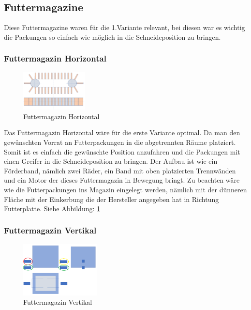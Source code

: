 \subsection{Futtermagazine}

Diese Futtermagazine waren für die 1.Variante relevant, bei diesen war es wichtig die Packungen so einfach wie möglich in die Schneideposition zu bringen. 

\subsubsection{Futtermagazin Horizontal}

\begin{figure}
\vspace{-40pt}
  \begin{center}
    \includegraphics[width=0.30\textwidth]{Bilder/Powerpoint/Futtermagazin_horizontal}
  \end{center}
  \caption{Futtermagazin Horizontal}
  \label{Magazin Horizontal}
  \vspace{-10pt}
\end{figure} 

Das Futtermagazin Horizontal wäre für die erste Variante optimal. Da man den gewünschten Vorrat an Futterpackungen in die abgetrennten Räume platziert. Somit ist es einfach die gewünschte Position anzufahren und die Packungen mit einen Greifer in die Schneideposition zu bringen. Der Aufbau ist wie ein Förderband, nämlich zwei Räder, ein Band mit oben platzierten Trennwänden und ein Motor der dieses Futtermagazin in Bewegung bringt. Zu beachten wäre wie die Futterpackungen ins Magazin eingelegt werden, nämlich mit der dünneren Fläche mit der Einkerbung die der Hersteller angegeben hat in Richtung Futterplatte. Siehe Abbildung: \ref{Magazin Horizontal}

\subsubsection{Futtermagazin Vertikal}

\begin{figure}
\vspace{-40pt}
  \begin{center}
    \includegraphics[width=0.36\textwidth]{Bilder/Powerpoint/Futtermagazin_vertikal}
  \end{center}
  \caption{Futtermagazin Vertikal}
  \label{Magazin Vertikal}
  \vspace{-10pt}
\end{figure}

